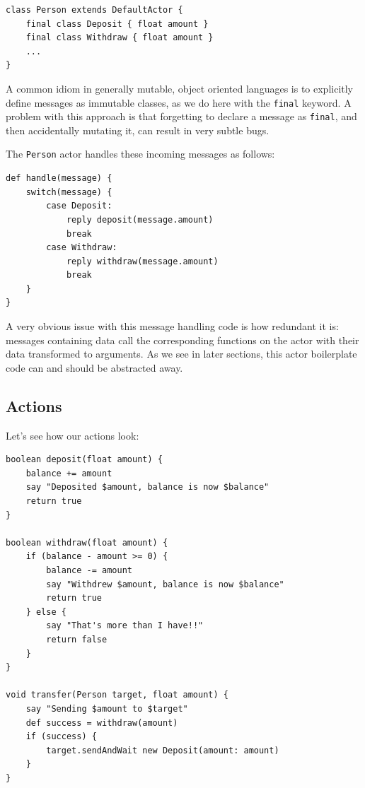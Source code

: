 \documentclass[a4paper,12pt]{kth-mag}
\begin{document}
\begin{listing}[H]
	\begin{verbatim}
class Person extends DefaultActor {
    final class Deposit { float amount }
    final class Withdraw { float amount }
    ...
}
	\end{verbatim}
\end{listing}

A common idiom in generally mutable, object oriented languages is to explicitly define messages as immutable classes, as we do here with the \texttt{final} keyword. A problem with this approach is that forgetting to declare a message as \texttt{final}, and then accidentally mutating it, can result in very subtle bugs.

The \texttt{Person} actor handles these incoming messages as follows:

\begin{listing}[H]
	\begin{verbatim}
def handle(message) { 
    switch(message) {
        case Deposit:
            reply deposit(message.amount)
            break
        case Withdraw: 
            reply withdraw(message.amount)
            break
    }
}
	\end{verbatim}
\end{listing}

A very obvious issue with this message handling code is how redundant it is: messages containing data call the corresponding functions on the actor with their data transformed to arguments. As we see in later sections, this actor boilerplate code can and should be abstracted away.

\subsection{Actions}

Let's see how our actions look:

\begin{listing}[H]
	\begin{verbatim}
boolean deposit(float amount) {
    balance += amount
    say "Deposited $amount, balance is now $balance"
    return true
}

boolean withdraw(float amount) {
    if (balance - amount >= 0) {
        balance -= amount
        say "Withdrew $amount, balance is now $balance"
        return true
    } else {
        say "That's more than I have!!"
        return false
    }
}

void transfer(Person target, float amount) {
    say "Sending $amount to $target"
    def success = withdraw(amount)
    if (success) { 
        target.sendAndWait new Deposit(amount: amount)
    } 
}
	\end{verbatim}
\end{listing}
\end{document}
